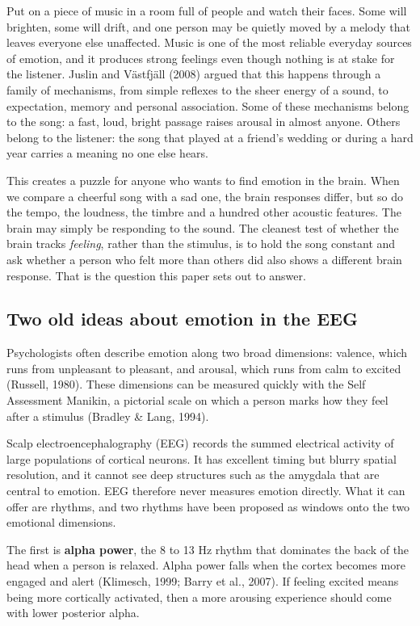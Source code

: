 \documentclass[11pt,a4paper]{article}
\begin{document}
Put on a piece of music in a room full of people and watch their faces. Some will brighten, some will drift, and one person may be quietly moved by a melody that leaves everyone else unaffected. Music is one of the most reliable everyday sources of emotion, and it produces strong feelings even though nothing is at stake for the listener. Juslin and V\"astfj\"all (2008) argued that this happens through a family of mechanisms, from simple reflexes to the sheer energy of a sound, to expectation, memory and personal association. Some of these mechanisms belong to the song: a fast, loud, bright passage raises arousal in almost anyone. Others belong to the listener: the song that played at a friend's wedding or during a hard year carries a meaning no one else hears.

This creates a puzzle for anyone who wants to find emotion in the brain. When we compare a cheerful song with a sad one, the brain responses differ, but so do the tempo, the loudness, the timbre and a hundred other acoustic features. The brain may simply be responding to the sound. The cleanest test of whether the brain tracks \emph{feeling}, rather than the stimulus, is to hold the song constant and ask whether a person who felt more than others did also shows a different brain response. That is the question this paper sets out to answer.

\subsection{Two old ideas about emotion in the EEG}

Psychologists often describe emotion along two broad dimensions: valence, which runs from unpleasant to pleasant, and arousal, which runs from calm to excited (Russell, 1980). These dimensions can be measured quickly with the Self Assessment Manikin, a pictorial scale on which a person marks how they feel after a stimulus (Bradley \& Lang, 1994).

Scalp electroencephalography (EEG) records the summed electrical activity of large populations of cortical neurons. It has excellent timing but blurry spatial resolution, and it cannot see deep structures such as the amygdala that are central to emotion. EEG therefore never measures emotion directly. What it can offer are rhythms, and two rhythms have been proposed as windows onto the two emotional dimensions.

The first is \textbf{alpha power}, the 8 to 13 Hz rhythm that dominates the back of the head when a person is relaxed. Alpha power falls when the cortex becomes more engaged and alert (Klimesch, 1999; Barry et al., 2007). If feeling excited means being more cortically activated, then a more arousing experience should come with lower posterior alpha.
\end{document}
